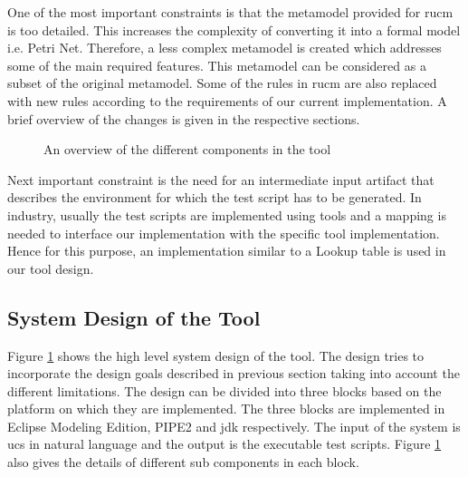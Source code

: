 One of the most important constraints is that the metamodel provided for \gls{rucm} is too detailed. This increases the complexity of converting it into a formal model i.e. Petri Net. Therefore, a less complex metamodel is created which addresses some of the main required features. This metamodel can be considered as a subset of the original metamodel. Some of the rules in \gls{rucm} are also replaced with new rules according to the requirements of our current implementation. A brief overview of the changes is given in the respective sections.

\begin{figure}[htb!]
\centering
{}
\caption{An overview of the different components in the tool}
\label{fig:systemdesign}
\end{figure}

Next important constraint is the need for an intermediate input artifact that describes the environment for which the test script has to be generated. In industry, usually the test scripts are implemented using tools and a mapping is needed to interface our implementation with the specific tool implementation.  Hence for this purpose, an implementation similar to a Lookup table is used in our tool design.

\subsection{System Design of the Tool}
Figure \ref{fig:systemdesign} shows the high level system design of the tool. The design tries to incorporate the design goals described in previous section taking into account the different limitations. The design can be divided into three blocks based on the platform on which they are implemented. The three blocks are implemented in Eclipse Modeling Edition, PIPE2 and \gls{jdk} respectively. The input of the system is \gls{ucs} in natural language and the output is the executable test scripts. Figure \ref{fig:systemdesign} also gives the details of different sub components in each block.

